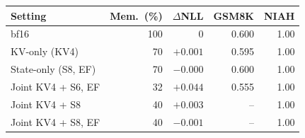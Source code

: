 \begin{tabular}{lrrrr}
\toprule
Setting & Mem.\ (\%) & $\Delta$NLL & GSM8K & NIAH \\
\midrule
bf16 & 100 & 0 & 0.600 & 1.00 \\
KV-only (KV4) & 70 & $+0.001$ & 0.595 & 1.00 \\
State-only (S8, EF) & 70 & $-0.000$ & 0.600 & 1.00 \\
Joint KV4 + S6, EF & 32 & $+0.044$ & 0.555 & 1.00 \\
Joint KV4 + S8 & 40 & $+0.003$ & -- & 1.00 \\
Joint KV4 + S8, EF & 40 & $-0.001$ & -- & 1.00 \\
\bottomrule
\end{tabular}

